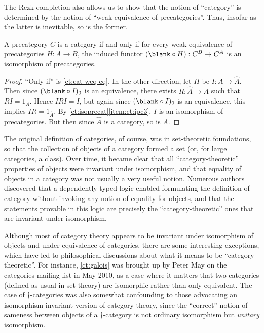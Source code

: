 The Rezk completion also allows us to show that the notion of ``category'' is determined by the notion of ``weak equivalence of precategories''.
Thus, insofar as the latter is inevitable, so is the former.

\begin{thm}\label{ct:weq-iso-precat-cat}
  A precategory $C$ is a category if and only if for every weak equivalence of precategories $H:A\to B$, the induced functor $(\blank\circ H):C^B \to C^A$ is an isomorphism of precategories.
\end{thm}
\begin{proof}
  ``Only if'' is \cref{ct:cat-weq-eq}.
  In the other direction, let $H$ be $I:A\to\widehat A$.
  Then since $(\blank\circ I)_0$ is an equivalence, there exists $R:\widehat A\to A$ such that $RI=1_A$.
  Hence $IRI=I$, but again since $(\blank\circ I)_0$ is an equivalence, this implies $IR =1_{\widehat A}$.
  By \cref{ct:isoprecat}\ref{item:ct:ipc3}, $I$ is an isomorphism of precategories.
  But then since $\widehat A$ is a category, so is $A$.
\end{proof}

%


\newpage

\sectionNotes

The original definition of categories, of course, was in set-theoretic foundations, so that the collection of objects of a category formed a set (or, for large categories, a class).
Over time, it became clear that all ``category-theoretic'' properties of objects were invariant under isomorphism, and that equality of objects in a category was not usually a very useful notion.
Numerous authors~\cite{blanc:eqv-log,freyd:invar-eqv,makkai:folds,makkai:comparing} discovered that a dependently typed logic enabled formulating the definition of category without invoking any notion of equality for objects, and that the statements provable in this logic are precisely the ``category-theoretic'' ones that are invariant under isomorphism.
%

Although most of category theory appears to be invariant under isomorphism of objects and under equivalence of categories, there are some interesting exceptions, which have led to philosophical discussions about what it means to be ``category-theoretic''.
For instance, \cref{ct:galois} was brought up by Peter May on the categories mailing list in May 2010, as a case where it matters that two categories (defined as usual in set theory) are isomorphic rather than only equivalent.
The case of $\dagger$-categories was also somewhat confounding to those advocating an isomorphism-invariant version of category theory, since the ``correct'' notion of sameness between objects of a $\dagger$-category is not ordinary isomorphism but \emph{unitary} isomorphism.
%

